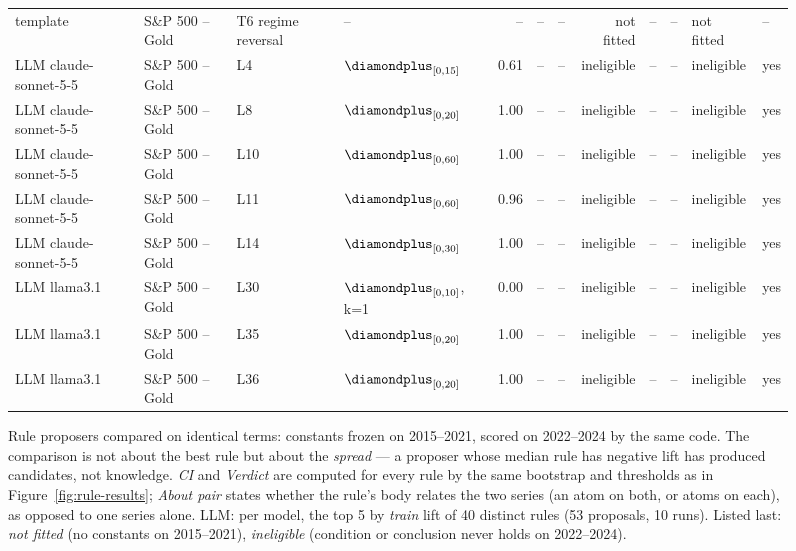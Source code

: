 \begin{figure}[t]
{\begin{tabular}{llllrrrrrrll}
template & S\&P 500 -- Gold & T6 regime reversal & -- & -- & -- & -- & not fitted & -- & -- & not fitted & -- \\
LLM claude-sonnet-5-5 & S\&P 500 -- Gold & L4 & $\diamondplus_{[0,15]}$ & 0.61 & -- & -- & ineligible & -- & -- & ineligible & yes \\
LLM claude-sonnet-5-5 & S\&P 500 -- Gold & L8 & $\diamondplus_{[0,20]}$ & 1.00 & -- & -- & ineligible & -- & -- & ineligible & yes \\
LLM claude-sonnet-5-5 & S\&P 500 -- Gold & L10 & $\diamondplus_{[0,60]}$ & 1.00 & -- & -- & ineligible & -- & -- & ineligible & yes \\
LLM claude-sonnet-5-5 & S\&P 500 -- Gold & L11 & $\diamondplus_{[0,60]}$ & 0.96 & -- & -- & ineligible & -- & -- & ineligible & yes \\
LLM claude-sonnet-5-5 & S\&P 500 -- Gold & L14 & $\diamondplus_{[0,30]}$ & 1.00 & -- & -- & ineligible & -- & -- & ineligible & yes \\
LLM llama3.1 & S\&P 500 -- Gold & L30 & $\diamondplus_{[0,10]}$, k=1 & 0.00 & -- & -- & ineligible & -- & -- & ineligible & yes \\
LLM llama3.1 & S\&P 500 -- Gold & L35 & $\diamondplus_{[0,20]}$ & 1.00 & -- & -- & ineligible & -- & -- & ineligible & yes \\
LLM llama3.1 & S\&P 500 -- Gold & L36 & $\diamondplus_{[0,20]}$ & 1.00 & -- & -- & ineligible & -- & -- & ineligible & yes \\
\bottomrule
\end{tabular}
}
\caption{\small{Rule proposers compared on identical terms: constants frozen on 2015--2021, scored on 2022--2024 by the same code. The comparison is not about the best rule but about the \emph{spread} --- a proposer whose median rule has negative lift has produced candidates, not knowledge. \emph{CI} and \emph{Verdict} are computed for every rule by the same bootstrap and thresholds as in Figure~\ref{fig:rule-results}; \emph{About pair} states whether the rule's body relates the two series (an atom on both, or atoms on each), as opposed to one series alone. LLM: per model, the top 5 by \emph{train} lift of 40 distinct rules (53 proposals, 10 runs). Listed last: \emph{not fitted} (no constants on 2015--2021), \emph{ineligible} (condition or conclusion never holds on 2022--2024).}}
\label{fig:rule-comparison}
\end{figure}
